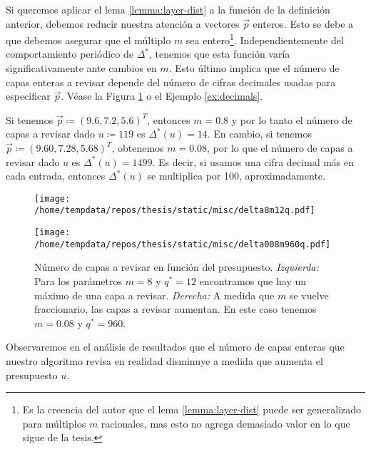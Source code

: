 Si queremos aplicar el lema \ref{lemma:layer-dist} a la función de la definición anterior, debemos
reducir nuestra atención a vectores $\vec{p}$ enteros. Esto se debe a que debemos asegurar que el
múltiplo $m$ sea entero\footnote{
	Es la creencia del autor que el lema \ref{lemma:layer-dist} puede ser generalizado para múltiplos
	$m$ racionales, mas esto no agrega demasiado valor en lo que sigue de la tesis.
}. Independientemente del comportamiento
periódico de $\Delta^*$, tenemos que esta función varía significativamente ante cambios en $m$.
Esto último implica que el número de capas enteras a revisar depende del número de cifras decimales
usadas para especificar $\vec{p}$. Véase la Figura \ref{fig:m:ex} o el Ejemplo \ref{ex:decimals}. 

\begin{example}
	\label{ex:decimals}
	Si tenemos $\vec{p} \coloneq (9.6, 7.2, 5.6)^T$, entonces $m = 0.8$ y por lo tanto el número de
	capas a revisar dado $u \coloneq 119$ es $\Delta^*(u) = 14$. En cambio, si tenemos $\vec{p} \coloneq
	(9.60, 7.28, 5.68)^T$, obtenemos $m = 0.08$, por lo que el número de capas a revisar dado $u$ es
	$\Delta^*(u) = 1499$. Es decir, si usamos una cifra decimal más en cada entrada, entonces
	$\Delta^*(u)$ se multiplica por 100, aproximadamente.
\end{example}

\begin{figure}[htbp]
  \centering

  \begin{minipage}[t]{0.48\textwidth}
    \centering
    \texttt{[image: /home/tempdata/repos/thesis/static/misc/delta8m12q.pdf]}
  \end{minipage}
  \hfill
  \begin{minipage}[t]{0.48\textwidth}
    \centering
    \texttt{[image: /home/tempdata/repos/thesis/static/misc/delta008m960q.pdf]}
  \end{minipage}

  \caption{Número de capas a revisar en función del presupuesto. \textit{Izquierda: }Para los
	  parámetros $m = 8$ y $q^* = 12$ encontramos que hay un máximo de una capa a revisar.
	\textit{Derecha: } A medida que $m$ se vuelve fraccionario, las capas a revisar aumentan. En
		este caso tenemos $m = 0.08$ y $q^* = 960$.}
  \label{fig:m:ex}
\end{figure}

Observaremos en el análisis de resultados que el número de capas enteras que nuestro algoritmo
revisa en realidad disminuye a medida que aumenta el presupuesto $u$.


